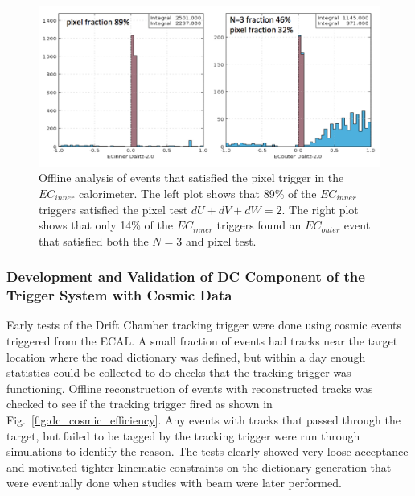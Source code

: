 \begin{figure}[!htb]
 	\centering
  	\includegraphics[width=1.0\columnwidth,keepaspectratio]{img/PixelFraction.png}
 	\caption{Offline analysis of events that satisfied the pixel trigger in the $EC_{inner}$  calorimeter. The
          left plot shows that 89\% of the $EC_{inner}$ triggers satisfied the pixel test $dU+dV+dW=2$. The right
          plot shows that only 14\% of the $EC_{inner}$ triggers found an $EC_{outer}$ event that satisfied both the
          $N=3$ and pixel test.}
	\label{fig:ec_offline}
\end{figure}

\subsubsection{Development and Validation of DC Component of the Trigger System with Cosmic Data}

Early tests of the Drift Chamber tracking trigger were done using cosmic events triggered from the ECAL. A
small fraction of events had tracks near the target location where the road dictionary was defined, but within
a day enough statistics could be collected to do checks that the tracking trigger was functioning. Offline
reconstruction of events with reconstructed tracks was checked to see if the tracking trigger fired as shown
in Fig.~\ref{fig:dc_cosmic_efficiency}. Any events with tracks that passed through the target, but failed to be
tagged by the tracking trigger were run through simulations to identify the reason. The tests clearly showed
very loose acceptance and motivated tighter kinematic constraints on the dictionary generation that were
eventually done when studies with beam were later performed.

